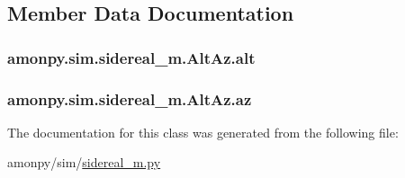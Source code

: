 \subsection{Member Data Documentation}
\hypertarget{classamonpy_1_1sim_1_1sidereal__m_1_1_alt_az_aa0ff247b310a833a5391c0b09f939d3b}{
\subsubsection[{alt}]{\setlength{\rightskip}{0pt plus 5cm}amonpy.\-sim.\-sidereal\-\_\-m.\-Alt\-Az.\-alt}}\label{classamonpy_1_1sim_1_1sidereal__m_1_1_alt_az_aa0ff247b310a833a5391c0b09f939d3b}
\hypertarget{classamonpy_1_1sim_1_1sidereal__m_1_1_alt_az_ab076f42a7d43bb00902e111c345e43c0}{
\subsubsection[{az}]{\setlength{\rightskip}{0pt plus 5cm}amonpy.\-sim.\-sidereal\-\_\-m.\-Alt\-Az.\-az}}\label{classamonpy_1_1sim_1_1sidereal__m_1_1_alt_az_ab076f42a7d43bb00902e111c345e43c0}


The documentation for this class was generated from the following file\-:\begin{DoxyCompactItemize}
\item 
amonpy/sim/\hyperlink{sidereal__m_8py}{sidereal\-\_\-m.\-py}\end{DoxyCompactItemize}

